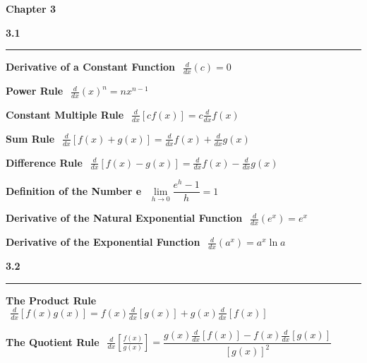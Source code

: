 \documentclass{article}
\begin{document}
\Huge\textbf{Chapter 3}
\vspace{16pt}

\begin{center}
\Large\textbf{3.1}

\noindent\hfill\rule{0.3\textwidth}{.4pt}\hfill
\vspace{12pt}
\end{center}

	\large\textbf{Derivative of a Constant Function}
	$\>\> \frac{d}{dx} (c) = 0$
	\vspace{12pt}

	\large\textbf{Power Rule}
	$\>\> \frac{d}{dx} (x)^n = nx^{n-1}$
	\vspace{12pt}

	\large\textbf{Constant Multiple Rule}
	$\>\> \frac{d}{dx} [cf(x)] = c \frac{d}{dx} f(x)$
	\vspace{12pt}

	\large\textbf{Sum Rule}
	$\>\> \frac{d}{dx} [f(x) + g(x)] = \frac{d}{dx} f(x) + \frac{d}{dx} g(x)$
	\vspace{12pt}

	\large\textbf{Difference Rule}
	$\>\> \frac{d}{dx} [f(x) - g(x)] = \frac{d}{dx} f(x) - \frac{d}{dx} g(x)$
	\vspace{12pt}

	\large\textbf{Definition of the Number e} 
	$\>\> \underset{h \to 0}{\lim} \dfrac{e^h - 1}{h} = 1$
	\vspace{12pt}

	\large\textbf{Derivative of the Natural Exponential Function}
	$\>\> \frac{d}{dx} (e^x) = e^x$
	\vspace{12pt}

	\large\textbf{Derivative of the Exponential Function}
	$\>\> \frac{d}{dx} (a^x) = a^x \ln a$
	\vspace{16pt}

\begin{center}
\Large\textbf{3.2}

\noindent\hfill\rule{0.3\textwidth}{.4pt}\hfill
\vspace{12pt}
\end{center}

	\large\textbf{The Product Rule}
	$\>\> \frac{d}{dx} [f(x)g(x)] = f(x) \frac{d}{dx} [g(x)] + g(x) \frac{d}{dx} [f(x)]$
	\vspace{12pt}

	\large\textbf{The Quotient Rule}
	$\>\> \frac{d}{dx} [\frac{f(x)}{g(x)}] = \dfrac{g(x) \frac{d}{dx} [f(x)] - f(x) \frac{d}{dx} [g(x)]}{[g(x)]^2}$
	\vspace{42pt}
\end{document}
